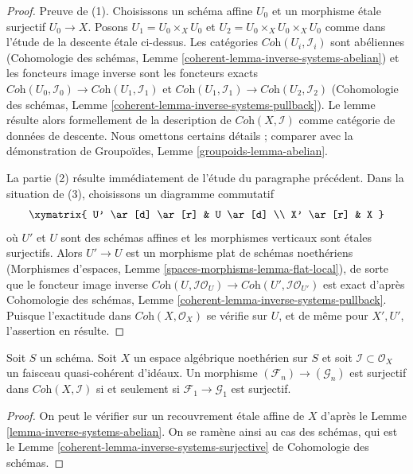 \begin{proof}
Preuve de (1). Choisissons un schéma affine $U_0$ et un morphisme étale surjectif
$U_0 \to X$. Posons $U_1 = U_0 \times_X U_0$ et
$U_2 = U_0 \times_X U_0 \times_X U_0$ comme dans l'étude de la
descente étale ci-dessus. Les catégories $\textit{Coh}(U_i, \mathcal{I}_i)$
sont abéliennes
(Cohomologie des schémas, Lemme \ref{coherent-lemma-inverse-systems-abelian})
et les foncteurs image inverse sont les foncteurs exacts
$\textit{Coh}(U_0, \mathcal{I}_0) \to \textit{Coh}(U_1, \mathcal{I}_1)$
et
$\textit{Coh}(U_1, \mathcal{I}_1) \to \textit{Coh}(U_2, \mathcal{I}_2)$
(Cohomologie des schémas, Lemme \ref{coherent-lemma-inverse-systems-pullback}).
Le lemme résulte alors formellement de la description de
$\textit{Coh}(X, \mathcal{I})$ comme catégorie de données de descente.
Nous omettons certains détails ; comparer avec la démonstration de
Groupoïdes, Lemme \ref{groupoids-lemma-abelian}.

\medskip\noindent
La partie (2) résulte immédiatement de l'étude du paragraphe précédent.
Dans la situation de (3), choisissons un diagramme commutatif
$$
\xymatrix{
U' \ar[d] \ar[r] & U \ar[d] \\
X' \ar[r] & X
}
$$
où $U'$ et $U$ sont des schémas affines et les morphismes verticaux sont
étales surjectifs. Alors $U' \to U$ est un morphisme plat de schémas
noethériens (Morphismes d'espaces, Lemme \ref{spaces-morphisms-lemma-flat-local}),
de sorte que le foncteur image inverse
$\textit{Coh}(U, \mathcal{I}\mathcal{O}_U) \to
\textit{Coh}(U', \mathcal{I}\mathcal{O}_{U'})$
est exact d'après
Cohomologie des schémas, Lemme \ref{coherent-lemma-inverse-systems-pullback}.
Puisque l'exactitude dans $\textit{Coh}(X, \mathcal{O}_X)$ se vérifie
sur $U$, et de même pour $X', U'$, l'assertion en résulte.
\end{proof}

\begin{lemma}
\label{lemma-inverse-systems-surjective}
Soit $S$ un schéma. Soit $X$ un espace algébrique noethérien sur $S$
et soit $\mathcal{I} \subset \mathcal{O}_X$ un faisceau quasi-cohérent
d'idéaux. Un morphisme $(\mathcal{F}_n) \to (\mathcal{G}_n)$ est surjectif dans
$\textit{Coh}(X, \mathcal{I})$ si et seulement si
$\mathcal{F}_1 \to \mathcal{G}_1$ est surjectif.
\end{lemma}

\begin{proof}
On peut le vérifier sur un recouvrement étale affine de $X$ d'après le
Lemme \ref{lemma-inverse-systems-abelian}.
On se ramène ainsi au cas des schémas, qui est le
Lemme \ref{coherent-lemma-inverse-systems-surjective} de Cohomologie des schémas.
\end{proof}


